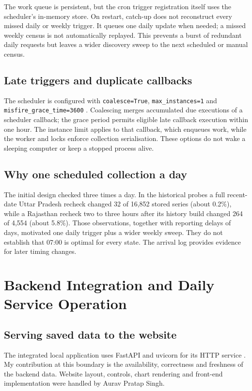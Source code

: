 \documentclass[12pt,a4paper,oneside]{report}
\newcommand{\auravname}{Aurav Pratap Singh}
\numberwithin{equation}{chapter}
\numberwithin{figure}{chapter}
\numberwithin{table}{chapter}
\theoremstyle{definition}
\begin{document}
The work queue is persistent, but the cron trigger registration itself uses the scheduler's in-memory store. On restart, catch-up does not reconstruct every missed daily or weekly trigger. It queues one daily update when needed; a missed weekly census is not automatically replayed. This prevents a burst of redundant daily requests but leaves a wider discovery sweep to the next scheduled or manual census.

\section{Late triggers and duplicate callbacks}
The scheduler is configured with \texttt{coalesce=True}, \texttt{max\_instances=1} and \texttt{misfire\_grace\_time=3600} \cite{apscheduler}. Coalescing merges accumulated due executions of a scheduler callback; the grace period permits eligible late callback execution within one hour. The instance limit applies to that callback, which enqueues work, while the worker and locks enforce collection serialisation. These options do not wake a sleeping computer or keep a stopped process alive.

\section{Why one scheduled collection a day}
The initial design checked three times a day. In the historical probes a full recent-date Uttar Pradesh recheck changed 32 of 16,852 stored series (about 0.2\%), while a Rajasthan recheck two to three hours after its history build changed 264 of 4,554 (about 5.8\%). Those observations, together with reporting delays of days, motivated one daily trigger plus a wider weekly sweep. They do not establish that 07:00 is optimal for every state. The arrival log provides evidence for later timing changes.

\chapter{Backend Integration and Daily Service Operation}

\section{Serving saved data to the website}
The integrated local application uses FastAPI and uvicorn for its HTTP service \cite{fastapi}. My contribution at this boundary is the availability, correctness and freshness of the backend data. Website layout, controls, chart rendering and front-end implementation were handled by \auravname.
\end{document}
